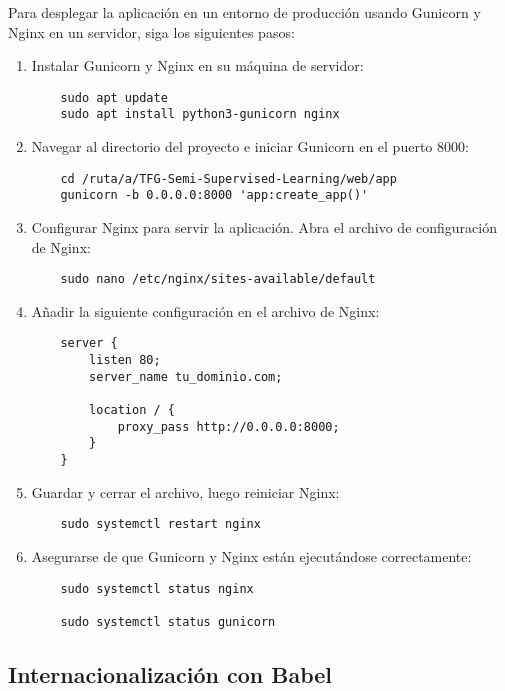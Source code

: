 Para desplegar la aplicación en un entorno de producción usando Gunicorn y Nginx en un servidor, siga los siguientes pasos:

\begin{enumerate}
    \item Instalar Gunicorn y Nginx en su máquina de servidor:
    \begin{verbatim}
    sudo apt update
    sudo apt install python3-gunicorn nginx
    \end{verbatim}

    \item Navegar al directorio del proyecto e iniciar Gunicorn en el puerto 8000:
    \begin{verbatim}
    cd /ruta/a/TFG-Semi-Supervised-Learning/web/app
    gunicorn -b 0.0.0.0:8000 'app:create_app()'
    \end{verbatim}

    \item Configurar Nginx para servir la aplicación. Abra el archivo de configuración de Nginx:
    \begin{verbatim}
    sudo nano /etc/nginx/sites-available/default
    \end{verbatim}

    \item Añadir la siguiente configuración en el archivo de Nginx:
    \begin{verbatim}
    server {
        listen 80;
        server_name tu_dominio.com;

        location / {
            proxy_pass http://0.0.0.0:8000;
        }
    }
    \end{verbatim}

    \item Guardar y cerrar el archivo, luego reiniciar Nginx:
    \begin{verbatim}
    sudo systemctl restart nginx
    \end{verbatim}

    \item Asegurarse de que Gunicorn y Nginx están ejecutándose correctamente:
    \begin{verbatim}
    sudo systemctl status nginx

    sudo systemctl status gunicorn
    \end{verbatim}
\end{enumerate}

\subsection{Internacionalización con Babel}

